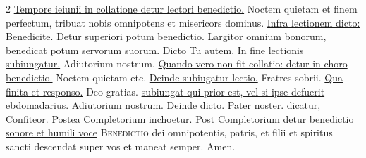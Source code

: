 \begin{multicols}{2}
{\color{Red} }
\newline \ul{Tempore ieiunii in collatione detur lectori benedictio.} Noctem quietam et finem perfectum, tribuat nobis omnipotens et misericors dominus. \ul{Infra lectionem dicto:} Benedicite. \ul{Detur superiori potum benedictio.} Largitor omnium bonorum, {\color{Red} \grecross } benedicat potum servorum suorum. \ul{Dicto} Tu autem. \ul{In fine lectionis subiungatur.} \V Adiutorium nostrum. %
\newline \ul{Quando vero non fit collatio: detur in choro benedictio.} Noctem quietam etc. \ul{Deinde subiugatur lectio.} Fratres sobrii. \ul{Qua finita et responso.} Deo gratias. \ul{subiungat qui prior est, vel si ipse defuerit ebdomadarius.} Adiutorium nostrum. \ul{Deinde dicto.} Pater noster. \ul{dicatur,} Confiteor. \ul{Postea Completorium inchoetur. Post Completorium detur benedictio sonore et humili voce}
\lettrine[lines=2]{\zallmancaps \color{Red} B}{enedictio} dei omnipotentis, patris, et filii et spiritus sancti descendat super vos et maneat semper. Amen.






\end{multicols}
